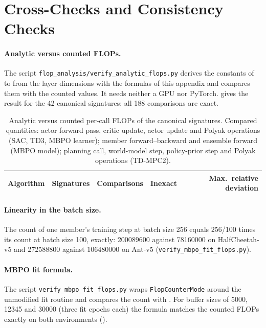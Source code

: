 \section{Cross-Checks and Consistency Checks}\label{sec:app-flop-checks}

\paragraph{Analytic versus counted FLOPs.} The script \texttt{flop\_analysis/verify\_analytic\_flops.py} derives the constants of  to  from the layer dimensions with the formulas of this appendix and compares them with the counted values.
It needs neither a GPU nor PyTorch.
 gives the result for the \num{42} canonical signatures: all \num{188} comparisons are exact.

\begin{table}[tbp]
  \centering
  \footnotesize
  \caption{Analytic versus counted per-call FLOPs of the canonical signatures.
    Compared quantities: actor forward pass, critic update, actor update and Polyak operations (SAC, TD3, MBPO learner); member forward--backward and ensemble forward (MBPO model); planning call, world-model step, policy-prior step and Polyak operations (TD-MPC2).}
  \label{tab:app-flop-crosscheck}
  \begin{tabular}{@{}lrrrr@{}}
    \toprule
    Algorithm & Signatures & Comparisons & Inexact & Max.\ relative deviation \\
    \midrule
    \bottomrule
  \end{tabular}
\end{table}

\paragraph{Linearity in the batch size.} The count of one member's training step at batch size \num{256} equals \num{256}/\num{100} times its count at batch size \num{100}, exactly: \num{200089600} against \num{78160000} on HalfCheetah-v5 and \num{272588800} against \num{106480000} on Ant-v5 (\texttt{verify\_mbpo\_fit\_flops.py}).

\paragraph{MBPO fit formula.} The script \texttt{verify\_mbpo\_fit\_flops.py} wraps \texttt{FlopCounterMode} around the unmodified fit routine and compares the count with .
For buffer sizes of \num{5000}, \num{12345} and \num{30000} (three fit epochs each) the formula matches the counted FLOPs exactly on both environments ().

